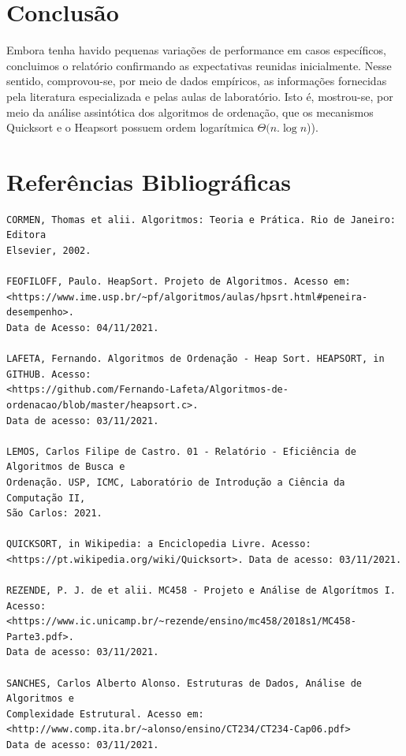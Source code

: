 \documentclass[a4paper, 12pt]{article}
\begin{document}
\section{Conclusão}

\tab{ }Embora tenha havido pequenas variações de performance em casos específicos, concluimos o relatório confirmando as expectativas reunidas inicialmente. Nesse sentido, comprovou-se, por meio de dados empíricos, as informações fornecidas pela literatura especializada e pelas aulas de laboratório. Isto é, mostrou-se, por meio da análise assintótica dos algoritmos de ordenação, que os mecanismos Quicksort e o Heapsort possuem ordem logarítmica $\Theta(n.\log{}n$)).


\vspace{0.8cm}
\section{Referências Bibliográficas}
\begin{verbatim}
CORMEN, Thomas et alii. Algoritmos: Teoria e Prática. Rio de Janeiro: Editora 
Elsevier, 2002.

FEOFILOFF, Paulo. HeapSort. Projeto de Algoritmos. Acesso em:
<https://www.ime.usp.br/~pf/algoritmos/aulas/hpsrt.html#peneira-desempenho>.
Data de Acesso: 04/11/2021.

LAFETA, Fernando. Algoritmos de Ordenação - Heap Sort. HEAPSORT, in GITHUB. Acesso: 
<https://github.com/Fernando-Lafeta/Algoritmos-de-ordenacao/blob/master/heapsort.c>. 
Data de acesso: 03/11/2021.

LEMOS, Carlos Filipe de Castro. 01 - Relatório - Eficiência de Algoritmos de Busca e
Ordenação. USP, ICMC, Laboratório de Introdução a Ciência da Computação II, 
São Carlos: 2021.

QUICKSORT, in Wikipedia: a Enciclopedia Livre. Acesso: 
<https://pt.wikipedia.org/wiki/Quicksort>. Data de acesso: 03/11/2021.

REZENDE, P. J. de et alii. MC458 - Projeto e Análise de Algorítmos I. Acesso:
<https://www.ic.unicamp.br/~rezende/ensino/mc458/2018s1/MC458-Parte3.pdf>.
Data de acesso: 03/11/2021.

SANCHES, Carlos Alberto Alonso. Estruturas de Dados, Análise de Algoritmos e
Complexidade Estrutural. Acesso em:
<http://www.comp.ita.br/~alonso/ensino/CT234/CT234-Cap06.pdf>
Data de acesso: 03/11/2021.

\end{verbatim}
\end{document}
